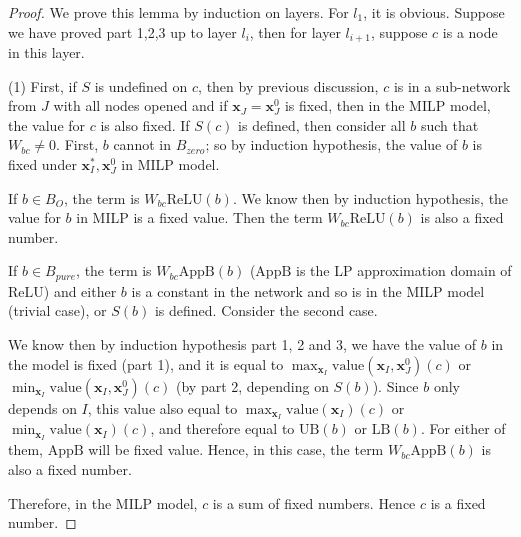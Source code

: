 \documentclass[]{article}
\theoremstyle{definition}
\newcommand{\ReLU}{\mathrm{ReLU}}
\newcommand{\Val}{\mathrm{value}}
\newcommand{\UB}{\mathrm{UB}}
\newcommand{\LB}{\mathrm{LB}}
\begin{document}
			\begin{proof}
				We prove this lemma by induction on layers. For $l_1$, it is obvious. Suppose we have proved part 1,2,3 up to layer $l_i$, then for layer $l_{i+1}$, suppose $c$ is a node in this layer. 
				
				(1)	First, if $S$ is undefined on $c$, then by previous discussion, $c$ is in a sub-network from $J$ with all nodes opened and if $\boldsymbol{x}_J=\boldsymbol{x}_J^0$ is fixed, then in the MILP model, the value for $c$ is also fixed. If $S(c)$ is defined, then consider all $b$ such that $W_{bc}\neq 0$. First, $b$ cannot in $B_{zero}$; so by induction hypothesis, the value of $b$ is fixed under $\boldsymbol{x}^*_I,\boldsymbol{x}^0_J$ in MILP model. 
				
				
				
				If $b\in B_O$, the term is $W_{bc}\ReLU(b)$. We know then by induction hypothesis, the value for $b$ in MILP is a fixed value. Then the term $W_{bc}\ReLU(b)$ is also a fixed number.  
				
				If $b\in B_{pure}$, the term is $W_{bc}\mathrm{AppB}(b)$ ($\mathrm{AppB}$ is the LP approximation domain of $\ReLU$) and either $b$ is a constant in the network and so is in the MILP model (trivial case), or $S(b)$ is defined. Consider the second case.
				
				We know then by induction hypothesis part 1, 2 and 3,  we have the value of $b$ in the model is fixed (part 1), and it is equal to $\max_{\boldsymbol{x}_I} \Val(\boldsymbol{x}_I,\boldsymbol{x}^0_J)(c)$ or $\min_{\boldsymbol{x}_I} \Val(\boldsymbol{x}_I,\boldsymbol{x}^0_J)(c)$ (by part 2, depending on $S(b)$). Since $b$ only depends on $I$, this value also equal to $\max_{\boldsymbol{x}_I} \Val(\boldsymbol{x}_I)(c)$ or $\min_{\boldsymbol{x}_I} \Val(\boldsymbol{x}_I)(c)$, and therefore equal to $\UB(b)$ or $\LB(b)$. For either of them, $\mathrm{AppB}$ will be fixed value. Hence, in this case, the term $W_{bc}\mathrm{AppB}(b)$ is also a fixed number.
				
				Therefore, in the MILP model, $c$ is a sum of fixed numbers. Hence $c$ is a fixed number.
				

\end{proof}
\end{document}
